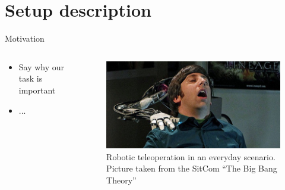 \documentclass[
xcolor=dvipsnames,
aspectratio=169,
9pt,
]{beamer}
\begin{document}
\section{Setup description}
\begin{frame}{Motivation}
	\begin{columns}
		\begin{column}{0.4\textwidth}
			\begin{itemize}
				\item Say why our task is important
				\item ...
			\end{itemize}
		\end{column}
		\begin{column}{0.6\textwidth}
			\begin{center}
				\begin{figure}
					\includegraphics[width=1\textwidth]{img/Wolowitz.jpg}
					\caption{Robotic teleoperation in an everyday scenario. Picture taken from the SitCom ``The Big Bang Theory''}
				\end{figure}
			\end{center}
		\end{column}
	\end{columns}
\end{frame}
\end{document}
